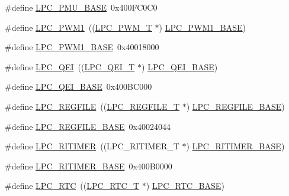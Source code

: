 \begin{DoxyCompactItemize}
\item 
\#define \hyperlink{group__PERIPH__175X__6X__BASE_ga865bed8ad61e9e273439ad1349a46d68}{L\+P\+C\+\_\+\+P\+M\+U\+\_\+\+B\+A\+SE}~0x400\+F\+C0\+C0
\item 
\#define \hyperlink{group__PERIPH__175X__6X__BASE_ga6e400c5c011db85f452eb2fb4a1ee7c2}{L\+P\+C\+\_\+\+P\+W\+M1}~((\hyperlink{structLPC__PWM__T}{L\+P\+C\+\_\+\+P\+W\+M\+\_\+T}              $\ast$) \hyperlink{group__PERIPH__407X__8X__BASE_gabb885bd92b4a003b94dc27c4700818bb}{L\+P\+C\+\_\+\+P\+W\+M1\+\_\+\+B\+A\+SE})
\item 
\#define \hyperlink{group__PERIPH__175X__6X__BASE_gabb885bd92b4a003b94dc27c4700818bb}{L\+P\+C\+\_\+\+P\+W\+M1\+\_\+\+B\+A\+SE}~0x40018000
\item 
\#define \hyperlink{group__PERIPH__175X__6X__BASE_ga71347b58898f54f8e9f00a6c652c7d49}{L\+P\+C\+\_\+\+Q\+EI}~((\hyperlink{structLPC__QEI__T}{L\+P\+C\+\_\+\+Q\+E\+I\+\_\+T}              $\ast$) \hyperlink{group__PERIPH__407X__8X__BASE_ga80fa25b18324c10c8e5c26893e6f0a67}{L\+P\+C\+\_\+\+Q\+E\+I\+\_\+\+B\+A\+SE})
\item 
\#define \hyperlink{group__PERIPH__175X__6X__BASE_ga80fa25b18324c10c8e5c26893e6f0a67}{L\+P\+C\+\_\+\+Q\+E\+I\+\_\+\+B\+A\+SE}~0x400\+B\+C000
\item 
\#define \hyperlink{group__PERIPH__175X__6X__BASE_ga2c74da31b7fd461d9b01e3241963f895}{L\+P\+C\+\_\+\+R\+E\+G\+F\+I\+LE}~((\hyperlink{structLPC__REGFILE__T}{L\+P\+C\+\_\+\+R\+E\+G\+F\+I\+L\+E\+\_\+T}          $\ast$) \hyperlink{group__PERIPH__407X__8X__BASE_gad2674eff10cea9243ab060ad1fbac9d2}{L\+P\+C\+\_\+\+R\+E\+G\+F\+I\+L\+E\+\_\+\+B\+A\+SE})
\item 
\#define \hyperlink{group__PERIPH__175X__6X__BASE_gad2674eff10cea9243ab060ad1fbac9d2}{L\+P\+C\+\_\+\+R\+E\+G\+F\+I\+L\+E\+\_\+\+B\+A\+SE}~0x40024044
\item 
\#define \hyperlink{group__PERIPH__175X__6X__BASE_gadf02cb70e7eb1a9e85e2b84ec1537fee}{L\+P\+C\+\_\+\+R\+I\+T\+I\+M\+ER}~((L\+P\+C\+\_\+\+R\+I\+T\+I\+M\+E\+R\+\_\+T          $\ast$) \hyperlink{group__PERIPH__175X__6X__BASE_ga37e5300b78c57ef9d338291e79610971}{L\+P\+C\+\_\+\+R\+I\+T\+I\+M\+E\+R\+\_\+\+B\+A\+SE})
\item 
\#define \hyperlink{group__PERIPH__175X__6X__BASE_ga37e5300b78c57ef9d338291e79610971}{L\+P\+C\+\_\+\+R\+I\+T\+I\+M\+E\+R\+\_\+\+B\+A\+SE}~0x400\+B0000
\item 
\#define \hyperlink{group__PERIPH__175X__6X__BASE_ga8303d3e5135b2a039f0dc5f93c194f78}{L\+P\+C\+\_\+\+R\+TC}~((\hyperlink{structLPC__RTC__T}{L\+P\+C\+\_\+\+R\+T\+C\+\_\+T}              $\ast$) \hyperlink{group__PERIPH__407X__8X__BASE_ga4618213cf968f8245814d7d3e7aa2e2e}{L\+P\+C\+\_\+\+R\+T\+C\+\_\+\+B\+A\+SE})

\end{DoxyCompactItemize}
